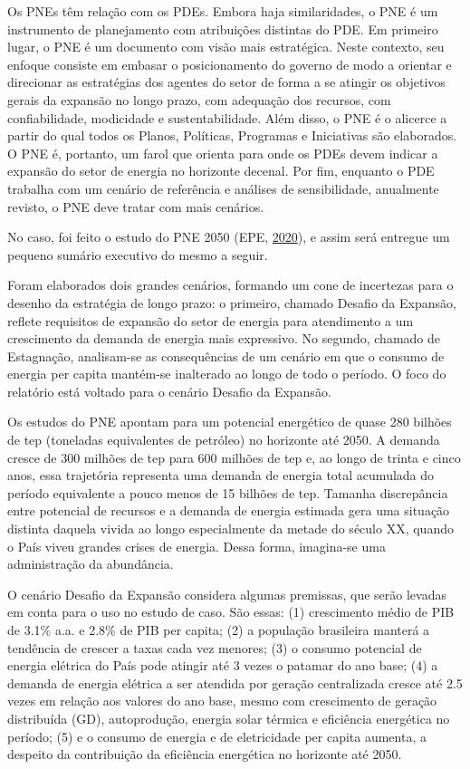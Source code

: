 \documentclass[grad,numbers]{coppe}
\begin{document}
  Os PNEs têm relação com os PDEs. Embora haja similaridades, o PNE é um instrumento de planejamento com atribuições distintas do PDE. Em primeiro lugar, o PNE é um documento com visão mais estratégica. Neste contexto, seu enfoque consiste em embasar o posicionamento do governo de modo a orientar e direcionar as estratégias dos agentes do setor de forma a se atingir os objetivos gerais da expansão no longo prazo, com adequação dos recursos, com confiabilidade, modicidade e sustentabilidade. Além disso, o PNE é o alicerce a partir do qual todos os Planos, Políticas, Programas e Iniciativas são elaborados. O PNE é, portanto, um farol que orienta para onde os PDEs devem indicar a expansão do setor de energia no horizonte decenal. Por fim, enquanto o PDE trabalha com um cenário de referência e análises de sensibilidade, anualmente revisto, o PNE deve tratar com mais cenários.

  No caso, foi feito o estudo do PNE 2050 (EPE, \protect\hyperlink{ref-epe2020}{2020}), e assim será entregue um pequeno sumário executivo do mesmo a seguir.

  Foram elaborados dois grandes cenários, formando um cone de incertezas para o desenho da estratégia de longo prazo: o primeiro, chamado Desafio da Expansão, reflete requisitos de expansão do setor de energia para atendimento a um crescimento da demanda de energia mais expressivo. No segundo, chamado de Estagnação, analisam-se as consequências de um cenário em que o consumo de energia per capita mantém-se inalterado ao longo de todo o período. O foco do relatório está voltado para o cenário Desafio da Expansão.

  Os estudos do PNE apontam para um potencial energético de quase 280 bilhões de tep (toneladas equivalentes de petróleo) no horizonte até 2050. A demanda cresce de 300 milhões de tep para 600 milhões de tep e, ao longo de trinta e cinco anos, essa trajetória representa uma demanda de energia total acumulada do período equivalente a pouco menos de 15 bilhões de tep. Tamanha discrepância entre potencial de recursos e a demanda de energia estimada gera uma situação distinta daquela vivida ao longo especialmente da metade do século XX, quando o País viveu grandes crises de energia. Dessa forma, imagina-se uma administração da abundância.

  O cenário Desafio da Expansão considera algumas premissas, que serão levadas em conta para o uso no estudo de caso. São essas: (1) crescimento médio de PIB de 3.1\% a.a. e 2.8\% de PIB per capita; (2) a população brasileira manterá a tendência de crescer a taxas cada vez menores; (3) o consumo potencial de energia elétrica do País pode atingir até 3 vezes o patamar do ano base; (4) a demanda de energia elétrica a ser atendida por geração centralizada cresce até 2.5 vezes em relação aos valores do ano base, mesmo com crescimento de geração distribuída (GD), autoprodução, energia solar térmica e eficiência energética no período; (5) e o consumo de energia e de eletricidade per capita aumenta, a despeito da contribuição da eficiência energética no horizonte até 2050.
\end{document}
